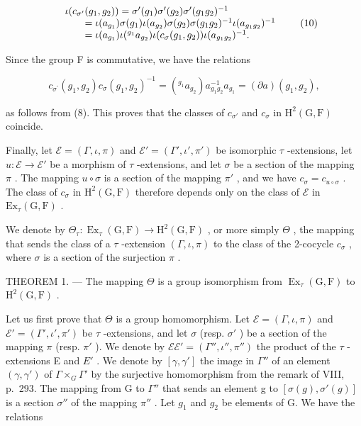 \[
\begin{array}{r l} & {\iota (c _ {\sigma^ {\prime}} (g _ {1}, g _ {2})) = \sigma^ {\prime} (g _ {1}) \sigma^ {\prime} (g _ {2}) \sigma^ {\prime} (g _ {1} g _ {2}) ^ {- 1}} \\ & {\qquad = \iota (a _ {g _ {1}}) \sigma (g _ {1}) \iota (a _ {g _ {2}}) \sigma (g _ {2}) \sigma (g _ {1} g _ {2}) ^ {- 1} \iota (a _ {g _ {1} g _ {2}}) ^ {- 1}} \\ & {\qquad = \iota (a _ {g _ {1}}) \iota (^ {g _ {1}} a _ {g _ {2}}) \iota (c _ {\sigma} (g _ {1}, g _ {2})) \iota (a _ {g _ {1} g _ {2}}) ^ {- 1}.} \end{array}\tag{10}
\]

Since the group F is commutative, we have the relations

\[
c _ {\sigma^ {\prime}} (g _ {1}, g _ {2}) c _ {\sigma} (g _ {1}, g _ {2}) ^ {- 1} = (^ {g _ {1}} a _ {g _ {2}}) a _ {g _ {1} g _ {2}} ^ {- 1} a _ {g _ {1}} = (\partial a) (g _ {1}, g _ {2}),\tag{11}
\]

as follows from (8). This proves that the classes of \(c_{\sigma'}\) and \(c_{\sigma}\) in \(\mathrm{H}^2(\mathrm{G},\mathrm{F})\) coincide.

Finally, let \(\mathcal{E} = (\Gamma, \iota, \pi)\) and \(\mathcal{E}' = (\Gamma', \iota', \pi')\) be isomorphic \(\tau\) -extensions, let \(u: \mathcal{E} \to \mathcal{E}'\) be a morphism of \(\tau\) -extensions, and let \(\sigma\) be a section of the mapping \(\pi\) . The mapping \(u \circ \sigma\) is a section of the mapping \(\pi'\) , and we have \(c_{\sigma} = c_{u \circ \sigma}\) . The class of \(c_{\sigma}\) in \(\mathrm{H}^2(\mathrm{G}, \mathrm{F})\) therefore depends only on the class of \(\mathcal{E}\) in \(\mathrm{Ex}_{\tau}(\mathrm{G}, \mathrm{F})\) .

We denote by \(\Theta_{\tau}: \operatorname{Ex}_{\tau}(\mathrm{G},\mathrm{F}) \to \mathrm{H}^{2}(\mathrm{G},\mathrm{F})\) , or more simply \(\Theta\) , the mapping that sends the class of a \(\tau\) -extension \((\Gamma,\iota,\pi)\) to the class of the 2-cocycle \(c_{\sigma}\) , where \(\sigma\) is a section of the surjection \(\pi\) .

THEOREM 1. --- The mapping \(\Theta\) is a group isomorphism from \(\operatorname{Ex}_{\tau}(\mathrm{G},\mathrm{F})\) to \(\mathrm{H}^2 (\mathrm{G},\mathrm{F})\) .

Let us first prove that \(\Theta\) is a group homomorphism. Let \(\mathcal{E} = (\Gamma, \iota, \pi)\) and \(\mathcal{E}' = (\Gamma', \iota', \pi')\) be \(\tau\) -extensions, and let \(\sigma\) (resp. \(\sigma'\) ) be a section of the mapping \(\pi\) (resp. \(\pi'\) ). We denote by \(\mathcal{E}\mathcal{E}' = (\Gamma'', \iota'', \pi'')\) the product of the \(\tau\) -extensions E and \(E'\) . We denote by \([\gamma, \gamma']\) the image in \(\Gamma''\) of an element \((\gamma, \gamma')\) of \(\Gamma \times_{G} \Gamma'\) by the surjective homomorphism from the remark of VIII, p.~293. The mapping from G to \(\Gamma''\) that sends an element g to \([\sigma(g), \sigma'(g)]\) is a section \(\sigma''\) of the mapping \(\pi''\) . Let \(g_1\) and \(g_2\) be elements of G. We have the relations

